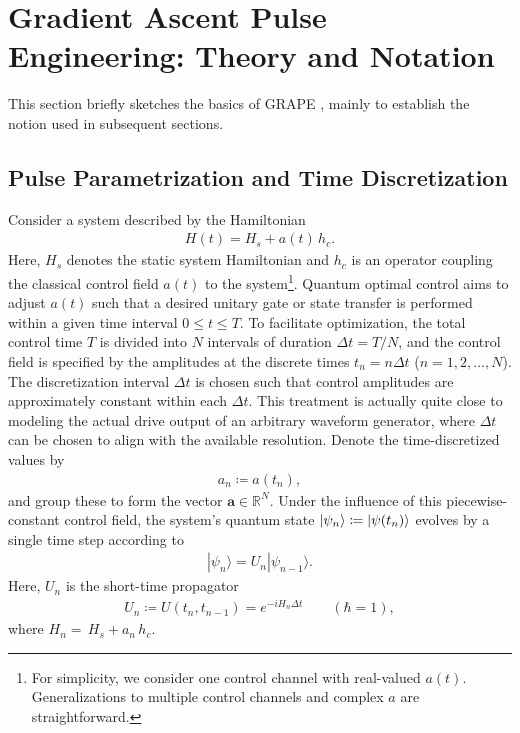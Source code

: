 \section{Gradient Ascent Pulse Engineering: Theory and Notation}
\label{sec:grape-theory}
This section briefly sketches the basics of GRAPE \cite{Khaneja2005}, mainly to establish the notion used in subsequent sections. 
\subsection{Pulse Parametrization and Time Discretization}
\label{subsec:pulse-param}
Consider a system described by the Hamiltonian
\begin{align}
     H(t) = H_s + a(t)\, h_c.
\end{align}
Here, $H_s$ denotes the static system Hamiltonian and $h_c$ is an operator coupling the classical control field $a(t)$ to the system\footnote{For simplicity, we consider one control channel with real-valued $a(t)$. Generalizations to multiple control channels and complex $a$ are straightforward.}. Quantum optimal control aims to adjust $a(t)$ such that a desired unitary gate or state transfer is performed within a given time interval $0\le t \le T$. To facilitate optimization, the total control time $T$ is divided into $N$ intervals of duration $\Delta t=T/N$, and the control field is specified by the amplitudes at the discrete times $t_n=n\Delta t$ ($n=1,2,\dots,N$). The discretization interval $\Delta t$ is chosen such that control amplitudes are approximately constant within each $\Delta t$. This treatment is actually quite close to modeling the actual drive output of an arbitrary waveform generator, where $\Delta t$ can be chosen to align with the available resolution. Denote the time-discretized values by
\begin{align}
\label{eq2}
    a_n \coloneqq a(t_n),
\end{align}
and group these to form the vector $\textbf{a}\in \mathbb{R}^{N}$.  
Under the influence of this piecewise-constant control field, the system's quantum state $|\psi_n\rangle\coloneqq |\psi(t_n)\rangle$ evolves by a single time step according to 
\begin{align}
\label{statepropagation}
  |\psi_n\rangle=U_n|\psi_{n-1}\rangle.
\end{align}
Here, $U_n$ is the short-time propagator
\begin{align}
\label{propagator}
  U_n\coloneqq U(t_n, t_{n-1}) =e^{-iH_n\Delta t}\qquad(\hbar=1),
\end{align}
where $H_n=\, H_s+a_n\, h_c $. 

